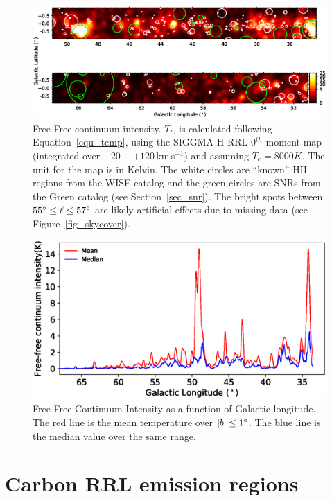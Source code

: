 \documentclass[manuscript]{aastex61}
\newcommand{\kms}{\,km\,s$^{-1}$}
\begin{document}
\begin{figure}[htbp]
\centering
\includegraphics[width = 7in]{temperature_thermal_map.eps}
\caption{Free-Free continuum intensity. $T_{C}$ is calculated following Equation~\ref{equ_temp}, using the SIGGMA H-RRL 0$^{th}$ moment map (integrated over $-20 - +120$\kms) and assuming $T_e = 8000 K$. The unit for the map is in Kelvin. The white circles are ``known'' HII regions from the WISE catalog and the green circles are SNRs from the Green catalog (see Section~\ref{sec_snr}). The bright spots between $55\mbox{$^\circ$} \leq \ell \leq 57\mbox{$^\circ$}$ are likely artificial effects due to missing data (see Figure~\ref{fig_skycover}).}
\label{fig_gal_free}
\end{figure}
\begin{figure}[bhpt]
\centering
\includegraphics[width = 6in]{temperature_thermal_plot.eps}
\caption{Free-Free Continuum Intensity as a function of Galactic longitude. The red line is the mean temperature over $|b|\leq 1\mbox{$^\circ$}$. The blue line is the median value over the same range.}
\label{fig_gal_plot}
\end{figure}

\section{Carbon RRL emission regions} \label{sec_crrl}
\end{document}
